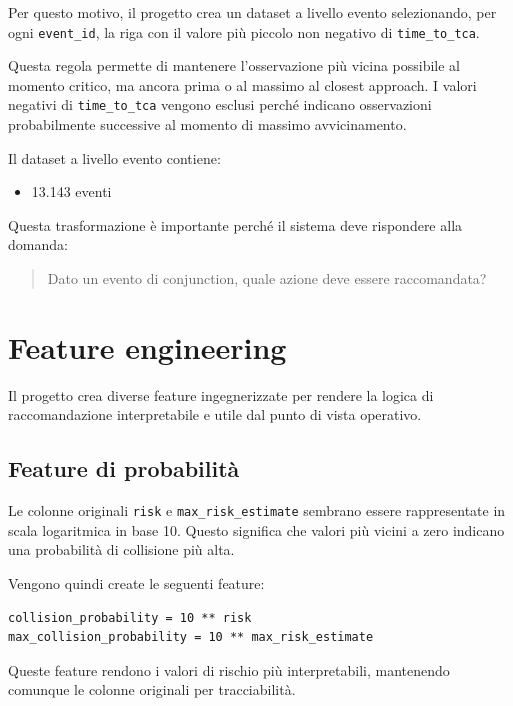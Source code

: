 \documentclass[12pt,a4paper]{article}
\begin{document}
Per questo motivo, il progetto crea un dataset a livello evento selezionando, per ogni \texttt{event\_id}, la riga con il valore più piccolo non negativo di \texttt{time\_to\_tca}.

Questa regola permette di mantenere l'osservazione più vicina possibile al momento critico, ma ancora prima o al massimo al closest approach. I valori negativi di \texttt{time\_to\_tca} vengono esclusi perché indicano osservazioni probabilmente successive al momento di massimo avvicinamento.

Il dataset a livello evento contiene:

\begin{itemize}
    \item 13.143 eventi
\end{itemize}

Questa trasformazione è importante perché il sistema deve rispondere alla domanda:

\begin{quote}
Dato un evento di conjunction, quale azione deve essere raccomandata?
\end{quote}

\section{Feature engineering}

Il progetto crea diverse feature ingegnerizzate per rendere la logica di raccomandazione interpretabile e utile dal punto di vista operativo.

\subsection{Feature di probabilità}

Le colonne originali \texttt{risk} e \texttt{max\_risk\_estimate} sembrano essere rappresentate in scala logaritmica in base 10. Questo significa che valori più vicini a zero indicano una probabilità di collisione più alta.

Vengono quindi create le seguenti feature:

\begin{verbatim}
collision_probability = 10 ** risk
max_collision_probability = 10 ** max_risk_estimate
\end{verbatim}

Queste feature rendono i valori di rischio più interpretabili, mantenendo comunque le colonne originali per tracciabilità.
\end{document}
